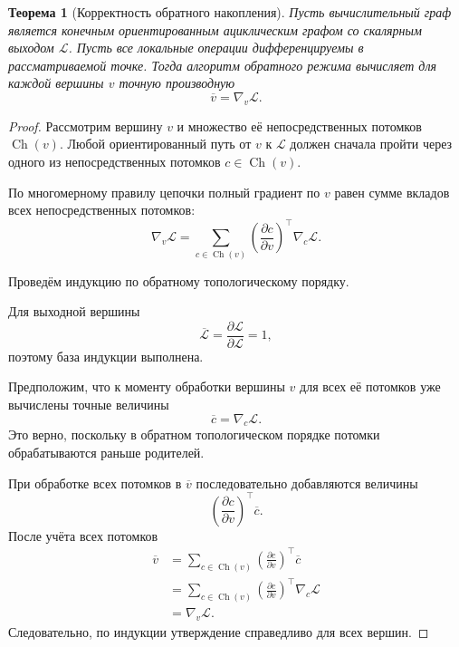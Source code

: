 \documentclass[12pt,a4paper]{article}
\theoremstyle{plain}
\newtheorem{theorem}{Теорема}[section]
\theoremstyle{definition}
\theoremstyle{remark}
\begin{document}
\begin{theorem}[Корректность обратного накопления]
Пусть вычислительный граф является конечным ориентированным
ациклическим графом со скалярным выходом $\mathcal{L}$. Пусть все
локальные операции дифференцируемы в рассматриваемой точке. Тогда
алгоритм обратного режима вычисляет для каждой вершины $v$ точную
производную
\[
    \overline{v}
    =
    \nabla_v\mathcal{L}.
\]
\end{theorem}

\begin{proof}
Рассмотрим вершину $v$ и множество её непосредственных потомков
$\operatorname{Ch}(v)$. Любой ориентированный путь от $v$ к
$\mathcal{L}$ должен сначала пройти через одного из непосредственных
потомков $c\in\operatorname{Ch}(v)$.

По многомерному правилу цепочки полный градиент по $v$ равен сумме
вкладов всех непосредственных потомков:
\[
    \nabla_v\mathcal{L}
    =
    \sum_{c\in\operatorname{Ch}(v)}
    \left(
        \frac{\partial c}{\partial v}
    \right)^\top
    \nabla_c\mathcal{L}.
\]

Проведём индукцию по обратному топологическому порядку.

Для выходной вершины
\[
    \overline{\mathcal{L}}
    =
    \frac{\partial\mathcal{L}}
    {\partial\mathcal{L}}
    =
    1,
\]
поэтому база индукции выполнена.

Предположим, что к моменту обработки вершины $v$ для всех её
потомков уже вычислены точные величины
\[
    \overline{c}
    =
    \nabla_c\mathcal{L}.
\]
Это верно, поскольку в обратном топологическом порядке потомки
обрабатываются раньше родителей.

При обработке всех потомков в $\overline{v}$ последовательно
добавляются величины
\[
    \left(
        \frac{\partial c}{\partial v}
    \right)^\top
    \overline{c}.
\]
После учёта всех потомков
\[
\begin{aligned}
    \overline{v}
    &=
    \sum_{c\in\operatorname{Ch}(v)}
    \left(
        \frac{\partial c}{\partial v}
    \right)^\top
    \overline{c}\\
    &=
    \sum_{c\in\operatorname{Ch}(v)}
    \left(
        \frac{\partial c}{\partial v}
    \right)^\top
    \nabla_c\mathcal{L}\\
    &=
    \nabla_v\mathcal{L}.
\end{aligned}
\]
Следовательно, по индукции утверждение справедливо для всех вершин.
\end{proof}
\end{document}
